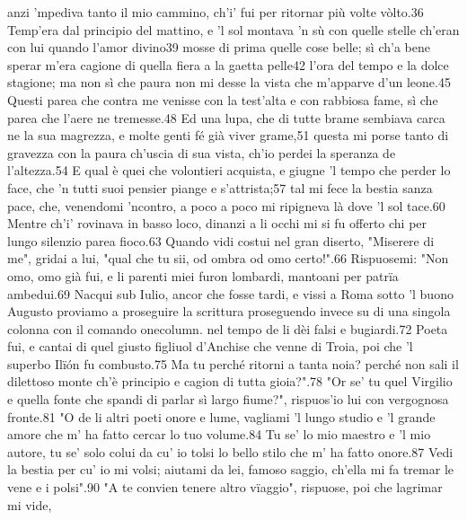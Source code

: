 \documentclass[12pt,a4paper]{article}
\begin{document}
anzi ’mpediva tanto il mio cammino,
ch’i’ fui per ritornar più volte vòlto.36
Temp’era dal principio del mattino,
e ’l sol montava ’n sù con quelle stelle
ch’eran con lui quando l’amor divino39
mosse di prima quelle cose belle;
sì ch’a bene sperar m’era cagione
di quella fiera a la gaetta pelle42
l’ora del tempo e la dolce stagione;
ma non sì che paura non mi desse
la vista che m'apparve d'un leone.45
Questi parea che contra me venisse
con la test’alta e con rabbiosa fame,
sì che parea che l’aere ne tremesse.48
Ed una lupa, che di tutte brame
sembiava carca ne la sua magrezza,
e molte genti fé già viver grame,51
questa mi porse tanto di gravezza
con la paura ch’uscia di sua vista,
ch’io perdei la speranza de l’altezza.54
E qual è quei che volontieri acquista,
e giugne ’l tempo che perder lo face,
che ’n tutti suoi pensier piange e s’attrista;57
tal mi fece la bestia sanza pace,
che, venendomi ’ncontro, a poco a poco
mi ripigneva là dove ’l sol tace.60
Mentre ch’i’ rovinava in basso loco,
dinanzi a li occhi mi si fu offerto
chi per lungo silenzio parea fioco.63
Quando vidi costui nel gran diserto,
"Miserere di me", gridai a lui,
"qual che tu sii, od ombra od omo certo!".66
Rispuosemi: "Non omo, omo già fui,
e li parenti miei furon lombardi,
mantoani per patrïa ambedui.69
Nacqui sub Iulio, ancor che fosse tardi,
e vissi a Roma sotto ’l buono Augusto
\newline \newline
\onecolumn
proviamo a proseguire la scrittura proseguendo
invece su di una singola colonna con il comando onecolumn.
\newline \newline
nel tempo de li dèi falsi e bugiardi.72
Poeta fui, e cantai di quel giusto
figliuol d’Anchise che venne di Troia,
poi che ’l superbo Ilïón fu combusto.75
Ma tu perché ritorni a tanta noia?
perché non sali il dilettoso monte
ch’è principio e cagion di tutta gioia?".78
"Or se’ tu quel Virgilio e quella fonte
che spandi di parlar sì largo fiume?",
rispuos’io lui con vergognosa fronte.81
"O de li altri poeti onore e lume,
vagliami ’l lungo studio e ’l grande amore
che m’ ha fatto cercar lo tuo volume.84
Tu se’ lo mio maestro e ’l mio autore,
tu se’ solo colui da cu’ io tolsi
lo bello stilo che m’ ha fatto onore.87
Vedi la bestia per cu’ io mi volsi;
aiutami da lei, famoso saggio,
ch’ella mi fa tremar le vene e i polsi".90
"A te convien tenere altro vïaggio",
rispuose, poi che lagrimar mi vide,
\end{document}
